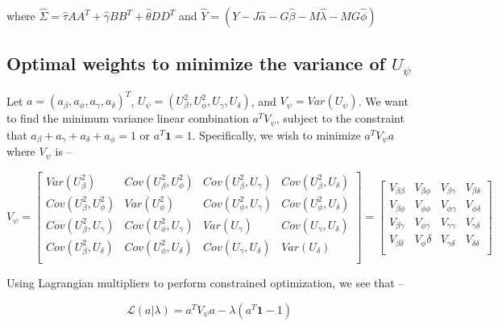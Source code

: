 \documentclass[hidelinks]{article}
\begin{document}
where $\hat{\Sigma} = \hat{\tau}AA^T + \hat{\gamma}BB^T + \hat{\theta}DD^T$ and $\hat{Y} = \left( Y - J \hat{\alpha} - G \hat{\beta} - M \hat{\lambda} - MG \hat{\phi} \right)$

\subsection{Optimal weights to minimize the variance of $U_\psi$}

Let $a=\left( a_\beta, a_\phi, a_\gamma, a_\delta \right)^T$, $U_\psi = \left( U_\beta^2, U_\phi^2, U_\gamma, U_\delta \right)$, and $V_\psi = Var\left(U_\psi\right)$. We want to find the minimum variance linear combination $a^T V_\psi$, subject to the constraint that $a_\beta + a_\gamma + a_\delta + a_\phi= 1$ or $a^T \boldsymbol{1} = 1$. Specifically, we wish to minimize $a^T V_\psi a$ where $V_\psi$ is --

\[
V_\psi = 
\begin{bmatrix}
Var(U^2_\beta) &  Cov(U^2_\beta,U^2_\phi) & Cov(U^2_\beta,U_\gamma) & Cov(U^2_\beta,U_\delta)  \\
Cov(U^2_\beta,U^2_\phi) &  Var(U^2_\phi) & Cov(U^2_\phi,U_\gamma) & Cov(U^2_\phi,U_\delta)  \\
Cov(U^2_\beta,U_\gamma) &  Cov(U^2_\phi,U_\gamma) & Var(U_\gamma) & Cov(U_\gamma,U_\delta)  \\
Cov(U^2_\beta,U_\delta) &  Cov(U^2_\phi,U_\delta) & Cov(U_\gamma,U_\delta) & Var(U_\delta)   \\
\end{bmatrix}
= 
\begin{bmatrix}
V_{\beta\beta} & V_{\beta\phi} & V_{\beta\gamma} & V_{\beta\delta} \\
V_{\beta\phi} &  V_{\phi\phi} & V_{\phi\gamma} & V_{\phi\delta}  \\
V_{\beta\gamma} &  V_{\phi\gamma} & V_{\gamma\gamma} & V_{\gamma\delta} \\
V_{\beta\delta} & V_\phi\delta &V_{\gamma\delta} & V_{\delta\delta} \\
\end{bmatrix}
\]

Using Lagrangian multipliers to perform constrained optimization, we see that --

\begingroup
\large
\[
\mathcal{L}\left(a | \lambda \right) = a^T V_\psi a -\lambda \left( a^T \boldsymbol{1} -1 \right)
\]
\endgroup
\end{document}
